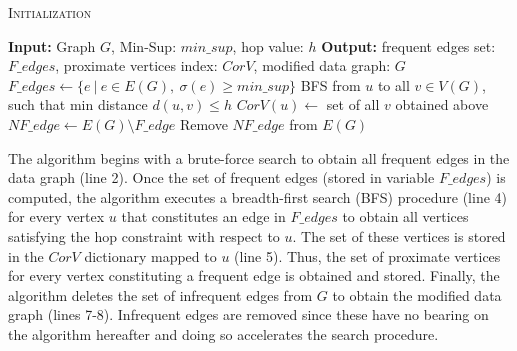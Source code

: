 {\begin{algorithm}%
	\caption{\textsc{Initialization}}\label{algo:initialization}
	\dontprintsemicolon
	\nonl \textbf{Input:} Graph $G$, {\sf Min-Sup:} $min\_sup$, hop value: $h$\;
	\nonl \textbf{Output:} frequent edges set: $F\_edges$, proximate vertices
	index: $CorV$, modified data graph: $G$ \;
		$F\_edges\leftarrow \{e\ |\ e \in E(G),\ \sigma(e) \geq min\_sup \}$\;
		{\textsc{BFS} from $u$ to all $v\in V(G)$, such that min distance
		$d(u,v)\le h$\; $CorV(u) \leftarrow$ set of all $v$ obtained above\;}
		$NF\_edge\leftarrow E(G)\setminus F\_edge$ \; Remove $NF\_edge$ from
		$E(G)$\; \;
\end{algorithm}
The algorithm begins with a brute-force search to obtain all frequent edges in
the data graph (line 2). Once the set of frequent edges (stored in variable
$F\_edges$) is computed, the algorithm executes a breadth-first search (BFS)
procedure (line 4) for every vertex $u$ that constitutes an edge in $F\_edges$
to obtain all vertices satisfying the hop constraint with respect to $u$. The
set of these vertices is stored in the $CorV$ dictionary mapped to $u$ (line 5).
Thus, the set of proximate vertices for every vertex constituting a frequent
edge is obtained and stored. Finally, the algorithm deletes the set of
infrequent edges from $G$ to obtain the modified data graph (lines 7-8).
Infrequent edges are removed since these have no bearing on the algorithm
hereafter and doing so accelerates the search procedure.

}
